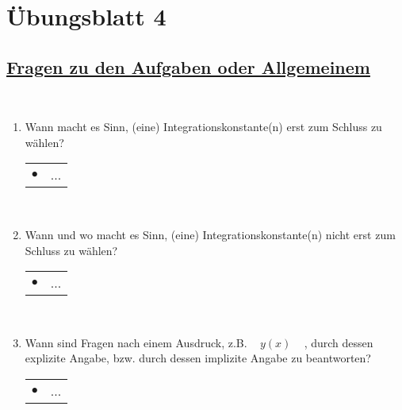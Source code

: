 


\chapter*{Übungsblatt 4}

\newpage

\section*{\underline{Fragen zu den Aufgaben oder Allgemeinem}}


~\\

\begin{enumerate}
	
	\item Wann macht es Sinn, (eine) Integrationskonstante(n) erst zum Schluss zu wählen? \\
	
	\begin{tabularx}{0.88\textwidth}{lX}
		$\bullet$ & ...
	\end{tabularx}
	
	~\\
	
	\item Wann und wo macht es Sinn, (eine) Integrationskonstante(n) nicht erst zum Schluss zu wählen? \\
	
	\begin{tabularx}{0.88\textwidth}{lX}
		$\bullet$ & ...
	\end{tabularx}
	
	~\\
	
	\item Wann sind Fragen nach einem Ausdruck, z.B. ~ $y(x)$ ~ , durch dessen explizite Angabe, bzw. durch dessen implizite Angabe zu beantworten? \\
	
	\begin{tabularx}{0.88\textwidth}{lX}
		$\bullet$ & ...
	\end{tabularx}
	
\end{enumerate}	



\newpage


%
%


